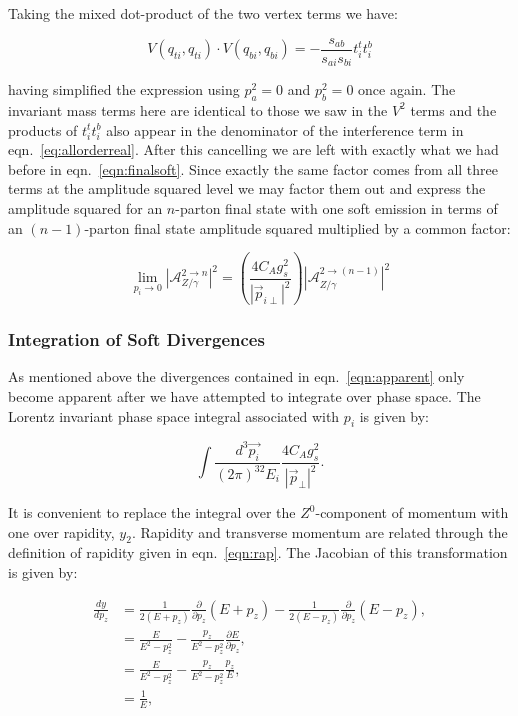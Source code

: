 			Taking the mixed dot-product of the two vertex terms we have:

			\begin{equation}
				V(q_{ti}, q_{ti})\cdot V(q_{bi}, q_{bi}) = -\frac{s_{ab}}{s_{ai}s_{bi}}t_i^tt_i^b
			\end{equation}

			having simplified the expression using $p_a^2=0$ and $p_b^2=0$ once again.  The invariant mass terms
			here are identical to those we saw in the $V^2$ terms and the products of $t_i^tt_i^b$ also appear
			in the denominator of the interference term in eqn.~\eqref{eq:allorderreal}.
			After this cancelling we are left with exactly what we had before in eqn.~\eqref{eqn:finalsoft}.
			Since exactly the same factor comes from all three terms at the amplitude squared level we may factor
			them out and express the amplitude squared for an $n$-parton final state with one soft emission in
			terms of an $(n-1)$-parton final state amplitude squared multiplied by a common factor:

			\begin{equation}
				\lim_{p_i\rightarrow0} |\mathcal{A}_{Z/\gamma}^{2\rightarrow n}|^2 = \left(\frac{4C_Ag_s^2}{|\vec{p}_{i\perp}|^2}\right)
					|\mathcal{A}_{Z/\gamma}^{2\rightarrow (n-1)}|^2
				\label{eqn:apparent}
			\end{equation}

		\subsubsection{Integration of Soft Divergences}
			\label{sub:subsection_name}

			As mentioned above the divergences contained in eqn.~\eqref{eqn:apparent} only become
			apparent after we have attempted to integrate over phase space.  The Lorentz
			invariant phase space integral associated with $p_i$ is given by:

			\begin{equation}
				\int\frac{d^3\vec{p_i}}{(2\pi)^32E_i}\frac{4C_Ag_s^2}{|\vec{p}_\perp|^2}.
			\end{equation}

			It is convenient to replace the integral over the $Z^0$-component of momentum with one over rapidity,
			$y_2$.  Rapidity and transverse momentum are related through the definition of rapidity given
			in eqn.~\eqref{eqn:rap}.  The Jacobian of this transformation is given by:

			\begin{align*}
				\frac{dy}{dp_z} &= \frac{1}{2(E+p_z)} \frac{\partial}{\partial p_z}(E+p_z) - \frac{1}{2(E-p_z)}\frac{\partial}{\partial p_z}(E-p_z),\\
				&= \frac{E}{E^2-p_z^2} - \frac{p_z}{E^2-p_z^2}\frac{\partial E}{\partial p_z},\\
				&= \frac{E}{E^2-p_z^2} - \frac{p_z}{E^2-p_z^2}\frac{p_z}{E},\\
				&= \frac{1}{E},
			\end{align*}

